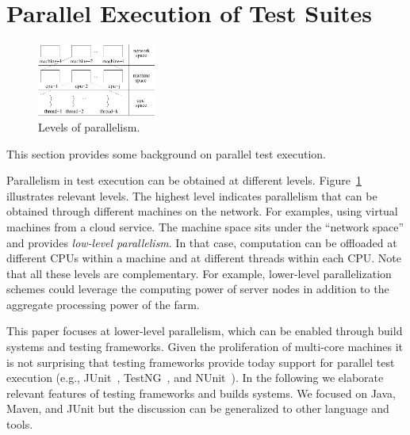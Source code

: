 \section{Parallel Execution of Test Suites}
\label{sec:modes}

\begin{figure}[t!]
  \centering
  \includegraphics[width=0.35\textwidth]{figs/parallel-levels.pdf}
  \vspace{-1ex}
  \caption{\label{fig:levels}Levels of parallelism.}
\end{figure}


This section provides some background on parallel test execution.

Parallelism in test execution can be obtained at different levels.
Figure~\ref{fig:levels} illustrates relevant levels.  The highest
level indicates parallelism that can be obtained through different
machines on the network.  For examples, using virtual machines from a
cloud service.  The machine space sits under the ``network space'' and
provides \emph{low-level parallelism}.  In that case, computation can
be offloaded at different CPUs within a machine and at different
threads within each CPU.  Note that all these levels are
complementary.  For example, lower-level parallelization schemes could
leverage the computing power of server nodes in addition to the
aggregate processing power of the farm.


This paper focuses at lower-level parallelism, which can be enabled
through build systems and testing frameworks.  Given the proliferation
of multi-core machines it is not surprising that testing frameworks
provide today support for parallel test execution (e.g.,
JUnit~\cite{junit-org}, TestNG~\cite{testng}, and NUnit~\cite{nunit}).
In the following we elaborate relevant features of testing frameworks
and builds systems.  We focused on Java, Maven, and JUnit but the
discussion can be generalized to other language and tools.


